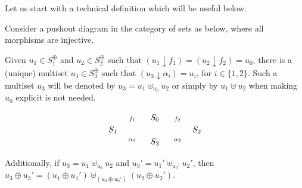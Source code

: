 \documentclass{LMCS}
\newcommand{\mjoin}{\ensuremath{\uplus}}
\newcommand{\monSub}[2]{\ensuremath{{#1}_{#2}^\oplus}}
\newcommand{\res}[2]{\ensuremath{({#1}\!\downarrow\!{#2})}}
\begin{document}
Let us start with a technical definition which will be useful below. 

\begin{prop}
  \label{pr:sum-mark}
  Consider a pushout diagram in the category of sets as below, where all
  morphisms are injective. 

  \noindent
  \begin{minipage}[c]{0.63\linewidth}
    Given $u_1 \in \monSub{S}{1}$ and $u_2 \in \monSub{S}{2}$ such
    that $\res{u_1}{f_1} = \res{u_2}{f_2} = u_0$, there is a (unique)
    multiset $u_3 \in \monSub{S}{3}$ such that $\res{u_3}{\alpha_i} =
    u_i$, for $i \in \{ 1, 2\}$.  Such a multiset $u_3$ will be
    denoted by $u_3 = u_1 \mjoin_{u_0} u_2$ or simply by $u_1 \mjoin
    u_2$ when making $u_0$ explicit is not needed.
  \end{minipage}
  \begin{minipage}[c]{0.36\linewidth}
    \vspace{-5mm}
    \[
    \xymatrix@C=12mm@R=0mm{
      & S_0 \ar[dl]_{f_1} \ar[dr]^{f_2} &\\
      S_1 \ar[dr]_{\alpha_1} & & S_2 \ar[dl]^{\alpha_2} \\
      & S_3 & }
    \]
  \end{minipage}
  
  \smallskip

  Additionally, if $u_3= u_1 \mjoin_{u_0} u_2$ and $u_3' = u_1'
  \mjoin_{u_0'} u_2'$, then $u_3 \oplus u_3' = (u_1 \oplus u_1')
  \mjoin_{(u_0 \oplus u_0')} (u_2 \oplus u_2')$.
\end{prop}
\end{document}
